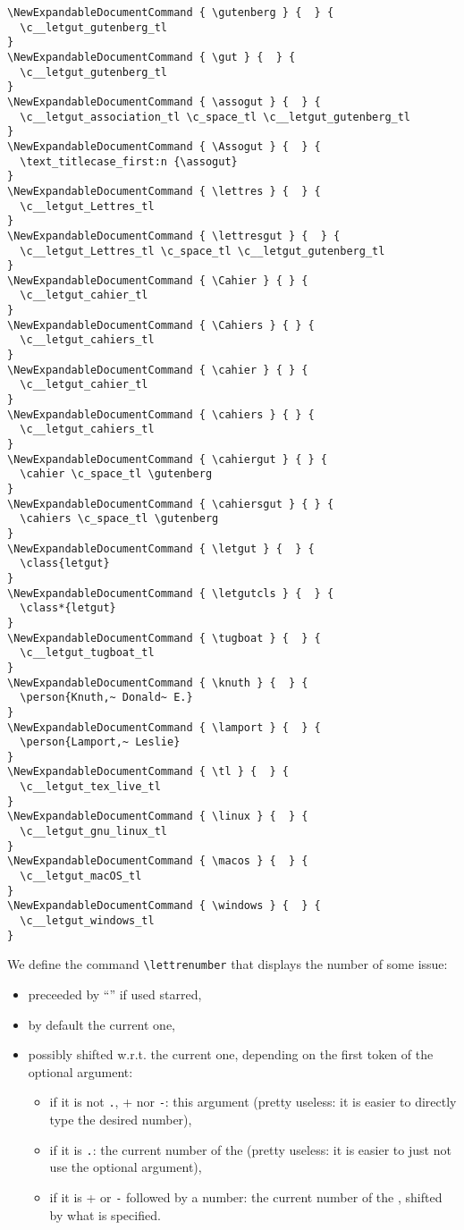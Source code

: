 \documentclass{letgut}
\begin{document}
\begin{lstlisting}
\NewExpandableDocumentCommand { \gutenberg } {  } {
  \c__letgut_gutenberg_tl
}
\NewExpandableDocumentCommand { \gut } {  } {
  \c__letgut_gutenberg_tl
}
\NewExpandableDocumentCommand { \assogut } {  } {
  \c__letgut_association_tl \c_space_tl \c__letgut_gutenberg_tl
}
\NewExpandableDocumentCommand { \Assogut } {  } {
  \text_titlecase_first:n {\assogut}
}
\NewExpandableDocumentCommand { \lettres } {  } {
  \c__letgut_Lettres_tl
}
\NewExpandableDocumentCommand { \lettresgut } {  } {
  \c__letgut_Lettres_tl \c_space_tl \c__letgut_gutenberg_tl
}
\NewExpandableDocumentCommand { \Cahier } { } {
  \c__letgut_cahier_tl
}
\NewExpandableDocumentCommand { \Cahiers } { } {
  \c__letgut_cahiers_tl
}
\NewExpandableDocumentCommand { \cahier } { } {
  \c__letgut_cahier_tl
}
\NewExpandableDocumentCommand { \cahiers } { } {
  \c__letgut_cahiers_tl
}
\NewExpandableDocumentCommand { \cahiergut } { } {
  \cahier \c_space_tl \gutenberg
}
\NewExpandableDocumentCommand { \cahiersgut } { } {
  \cahiers \c_space_tl \gutenberg
}
\NewExpandableDocumentCommand { \letgut } {  } {
  \class{letgut}
}
\NewExpandableDocumentCommand { \letgutcls } {  } {
  \class*{letgut}
}
\NewExpandableDocumentCommand { \tugboat } {  } {
  \c__letgut_tugboat_tl
}
\NewExpandableDocumentCommand { \knuth } {  } {
  \person{Knuth,~ Donald~ E.}
}
\NewExpandableDocumentCommand { \lamport } {  } {
  \person{Lamport,~ Leslie}
}
\NewExpandableDocumentCommand { \tl } {  } {
  \c__letgut_tex_live_tl
}
\NewExpandableDocumentCommand { \linux } {  } {
  \c__letgut_gnu_linux_tl
}
\NewExpandableDocumentCommand { \macos } {  } {
  \c__letgut_macOS_tl
}
\NewExpandableDocumentCommand { \windows } {  } {
  \c__letgut_windows_tl
}
\end{lstlisting}

We define the command \lstinline+\lettrenumber+ that displays the number of
some  issue:

\begin{itemize}
\item preceeded by “\no” if used starred,
\item by default the current one,
\item possibly shifted w.r.t. the current one, depending on the first token of the
optional argument:
\begin{itemize}
\item if it is not \lstinline+.+, \lstinline+++ nor \lstinline+-+: this argument (pretty useless: it is easier
to directly type the desired number),
\item if it is \lstinline+.+: the current number of the  (pretty useless: it is
easier to just not use the optional argument),
\item if it is \lstinline+++ or \lstinline+-+ followed by a number: the current number of the ,
shifted by what is specified.
\end{itemize}
\end{itemize}
\end{document}

